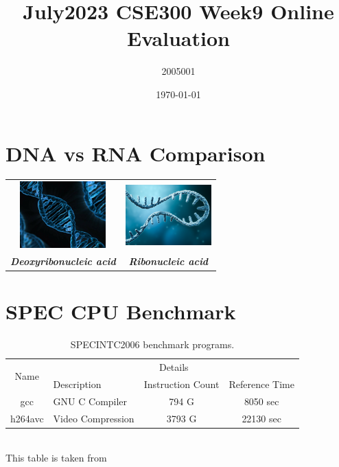 \documentclass[11pt]{article}
\title{July2023 CSE300 Week9 Online Evaluation}
\author{2005001}
\date{\today}
\begin{document}
	\maketitle
	
	\section*{DNA vs RNA Comparison}
	
	\begin{center}
		
		\begin{tabular}{cc}
			\includegraphics[scale=1]{images/DNA.png}
			& 
			\includegraphics[scale=1]{images/RNA.png}\\
			\textbf{\textit{Deoxyribonucleic acid}} 
			&
			\textbf{\textit{Ribonucleic acid}}
		\end{tabular}
		
	\end{center}
	
	\section*{SPEC CPU Benchmark}
	
	\begin{table}[h]
		\centering
		\caption{SPECINTC2006 benchmark programs.}
		\begin{tabular}{|c|l|c|c|}
			\hline
			\multirow{2}{*}{Name} & \multicolumn{3}{|c|}{Details} \\
			\cline{2-4}
			& Description & Instruction Count & Reference Time \\
			\hline
			gcc & GNU C Compiler & 794 G & 8050 sec \\
			\hline
			h264avc & Video Compression & 3793 G & 22130 sec \\
			\hline
		\end{tabular}
		\label{tab:my_label}
		\\
		This table is taken from \cite{mipsbook}
	\end{table}
	
\end{document}
